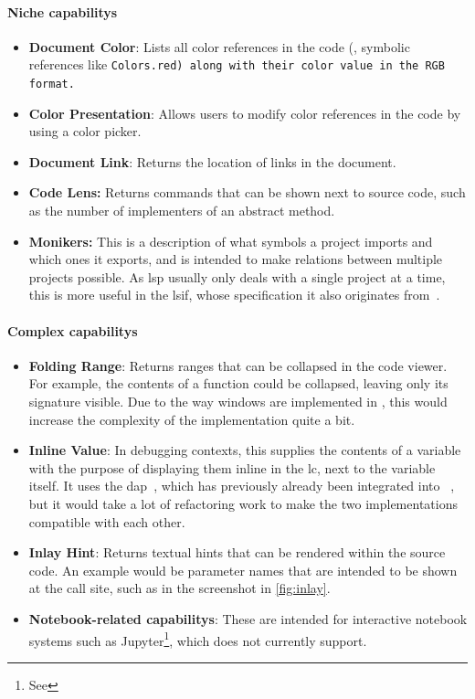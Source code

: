 \documentclass[../thesis]{subfiles}
\begin{document}
\paragraph{Niche \glspl{capability}}
\begin{itemize}
	\item \textbf{Document Color}: Lists all color references in the code (\eg, symbolic references like \tt{Colors.red}) along with their color value in the RGB format.
	\item \textbf{Color Presentation}: Allows users to modify color references in the code by using a color picker.
	\item \textbf{Document Link}: Returns the location of links in the document.
	\item \textbf{Code Lens:} Returns commands that can be shown next to source code, such as the number of implementers of an abstract method.
	\item \textbf{Monikers:} This is a description of what symbols a project imports and which ones it exports, and is intended to make relations between multiple projects possible.
	      As \gls{lsp} usually only deals with a single project at a time, this is more useful in the \gls{lsif}, whose specification it also originates from~\cite{lsif}.
\end{itemize}
\paragraph{Complex \glspl{capability}}
\begin{itemize}
	\item \textbf{Folding Range}: Returns \glspl{range} that can be collapsed in the code viewer.
	      For example, the contents of a function could be collapsed, leaving only its signature visible.
	      Due to the way \glspl{window} are implemented in \SEE{}, this would increase the complexity of the implementation quite a bit.
	\item \textbf{Inline Value}: In debugging contexts, this supplies the contents of a variable with the purpose of displaying them inline in the \gls{lc}, next to the variable itself.
	      It uses the \gls{dap}~\cite{dap}, which has previously already been integrated into \SEE{}~\cite{rohlfing2024}, but it would take a lot of refactoring work to make the two implementations compatible with each other.
	\item \textbf{Inlay Hint}: Returns textual hints that can be rendered within the source code.
	      An example would be parameter names that are intended to be shown at the call site, such as in the screenshot in \cref{fig:inlay}.
	\item \textbf{Notebook-related \glspl{capability}}: These are intended for interactive notebook systems such as Jupyter\footnote{See }, which \SEE{} does not currently support.
\end{itemize}
\end{document}
